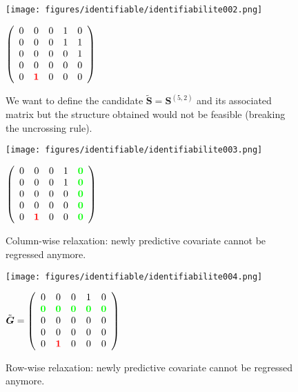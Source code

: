 \documentclass[12pt,a4paper]{report}
\begin{document}
\begin{figure}
	\begin{minipage}[c]{.45\linewidth}
\texttt{[image: figures/identifiable/identifiabilite002.png]} 
	\end{minipage}
	\begin{minipage}[c]{.45\linewidth}
		$\left( \begin{array}{ccccc}
		0 & 0 & 0 & 1 & 0 \\ 
		0 & 0 & 0 & 1 & 1 \\ 
		0 & 0 & 0 & 0 & 1 \\ 
		0 & 0 & 0 & 0 & 0 \\ 
		0 & \textcolor{red}{\textbf{1}}& 0 & 0 & 0
		\end{array} \right)$
	\end{minipage}
	\caption{We want to define the candidate $\tilde{\boldsymbol{S}}=\boldsymbol{S}^{(5,2)}$ and its associated matrix but the structure obtained would not be feasible (breaking the uncrossing rule). }\label{ident2}
\end{figure}		
\begin{figure}
	\begin{minipage}[c]{.45\linewidth}
\texttt{[image: figures/identifiable/identifiabilite003.png]} 
	\end{minipage}
	\begin{minipage}[c]{.45\linewidth}
		$\left( \begin{array}{ccccc}
		0 & 0 & 0 & 1 & \textcolor{green}{\textbf{0}} \\ 
		0 & 0 & 0 & 1 & \textcolor{green}{\textbf{0}} \\ 
		0 & 0 & 0 & 0 & \textcolor{green}{\textbf{0}} \\ 
		0 & 0 & 0 & 0 & \textcolor{green}{\textbf{0}} \\ 
		0 & \textcolor{red}{\textbf{1}}& 0 & 0 & \textcolor{green}{\textbf{0}}
		\end{array} \right)$
	\end{minipage}
	\caption{Column-wise relaxation: newly predictive covariate cannot be regressed anymore. }\label{ident3}
\end{figure}		
\begin{figure}
	\begin{minipage}[c]{.45\linewidth}
\texttt{[image: figures/identifiable/identifiabilite004.png]} 
	\end{minipage}
	\begin{minipage}[c]{.45\linewidth}
		$\tilde{\boldsymbol{G}}=\left( \begin{array}{ccccc}
		0 & 0 & 0 & 1 & 0 \\ 
		\textcolor{green}{\textbf{0}} & \textcolor{green}{\textbf{0}} & \textcolor{green}{\textbf{0}} & \textcolor{green}{\textbf{0}} & \textcolor{green}{\textbf{0}} \\ 
		0 & 0 & 0 & 0 & 0 \\ 
		0 & 0 & 0 & 0 & 0 \\ 
		0 & \textcolor{red}{\textbf{1}}& 0 & 0 & 0
		\end{array} \right)$
	\end{minipage}
	\caption{Row-wise relaxation: newly predictive covariate cannot be regressed anymore. }\label{ident4}
\end{figure}	
\end{document}
